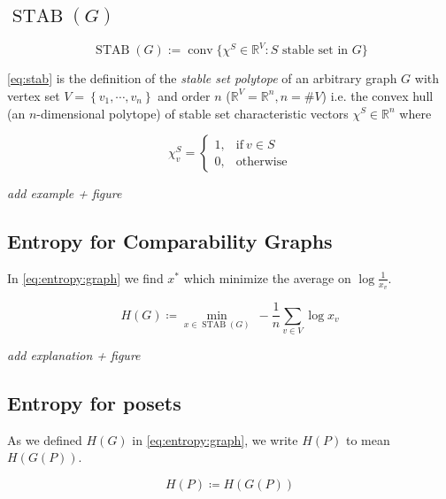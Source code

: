 \subsection{$\operatorname{STAB}(G)$}


\begin{equation}
\operatorname{STAB}(G) := \operatorname{conv}\{\chi^S \in \mathbb{R}^V : S\text{ stable set in }G\}
\label{eq:stab}
\end{equation}

\ref{eq:stab} is the definition of the \emph{stable set polytope} of an arbitrary graph $G$ with vertex set $V = \left\{{v_1, \cdots, v_n }\right\}$ and order $n$ ($\mathbb{R}^V = \mathbb{R}^n, n = \#V$) i.e. the convex hull (an $n$-dimensional polytope) of stable set characteristic vectors $\chi^S \in \mathbb{R}^n$ where

$$ \chi^S_v =\begin{cases}
      1, & \text{if}\ v \in S\\
      0, & \text{otherwise}
    \end{cases}$$


\emph{add example + figure}


\subsection{Entropy for Comparability Graphs}

In \ref{eq:entropy:graph} we find $x^*$ which minimize the average on $\log \frac{1}{x_v}$.

\begin{equation}
{H}(G) \coloneqq \min_{x \in \operatorname{STAB}(G)}~ -\frac{1}{n} \sum_{v \in V} \log x_v
\label{eq:entropy:graph}
\end{equation}


\emph{add explanation + figure}


\subsection{Entropy for posets}


As we defined ${H}(G)$ in \ref{eq:entropy:graph}, we write ${H}(P)$ to mean ${H}(G(P))$.

\begin{equation}
{H}(P) \coloneqq {H}({G}(P))
\label{eq:entropy:poset}
\end{equation}
